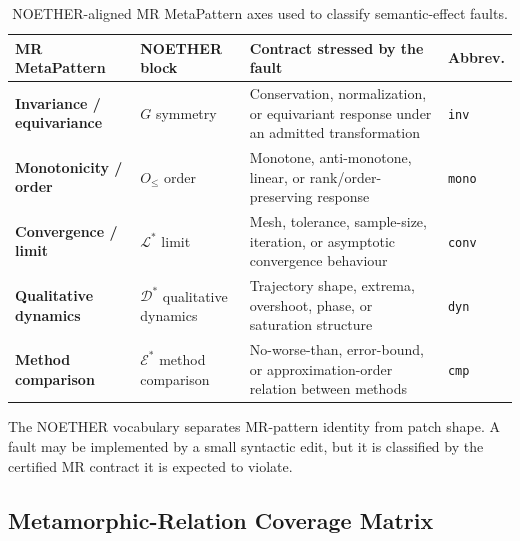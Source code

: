\documentclass[manuscript,screen,review]{acmart}
\begin{document}
{%
\begin{longtable}[]{@{}p{}p{}p{}p{}@{}}
\caption{NOETHER-aligned MR MetaPattern axes used to classify semantic-effect faults.}\label{tab:p2-03}\\
\toprule\noalign{}
MR MetaPattern & NOETHER block & Contract stressed by the fault & Abbrev. \\
\midrule\noalign{}
\endfirsthead
\endhead
\bottomrule\noalign{}
\endlastfoot
\textbf{Invariance / equivariance} & $G$ symmetry & Conservation, normalization, or equivariant response under an admitted transformation & \texttt{inv} \\
\textbf{Monotonicity / order} & $O_{\le}$ order & Monotone, anti-monotone, linear, or rank/order-preserving response & \texttt{mono} \\
\textbf{Convergence / limit} & $\mathcal{L}^{*}$ limit & Mesh, tolerance, sample-size, iteration, or asymptotic convergence behaviour & \texttt{conv} \\
\textbf{Qualitative dynamics} & $\mathcal{D}^{*}$ qualitative dynamics & Trajectory shape, extrema, overshoot, phase, or saturation structure & \texttt{dyn} \\
\textbf{Method comparison} & $\mathcal{E}^{*}$ method comparison & No-worse-than, error-bound, or approximation-order relation between methods & \texttt{cmp} \\
\end{longtable}
}

The NOETHER vocabulary separates MR-pattern identity from patch shape.
A fault may be implemented by a small syntactic edit, but it is classified
by the certified MR contract it is expected to violate.

\subsection{Metamorphic-Relation Coverage Matrix}\label{cell-instantiation-matrix}
\end{document}
